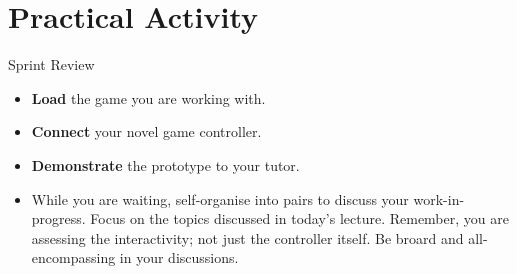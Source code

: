 \documentclass[xcolor={dvipsnames}]{beamer}\usepackage{etoolbox}\newtoggle{printable}\togglefalse{printable}
\begin{document}
\part{Practical Activity}
\frame{\partpage}

\begin{frame}{Sprint Review}
	\begin{itemize}
		\item \textbf{Load} the game you are working with.
		\item \textbf{Connect} your novel game controller.
		\item \textbf{Demonstrate} the prototype to your tutor.
		\item While you are waiting, self-organise into pairs to discuss your work-in-progress. Focus on the topics
		discussed in today's lecture. Remember, you are assessing the interactivity; not just the controller
		itself. Be broard and all-encompassing in your discussions.
	\end{itemize}
\end{frame}


%
\end{document}
